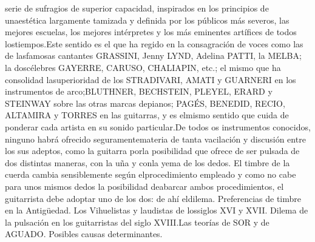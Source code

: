 \documentclass[
10pt, %
a4paper, %
oneside, %
headinclude,footinclude, %
BCOR5mm, %
]{scrartcl}
\begin{document}
{serie de sufragios de superior capacidad, inspirados en los principios de unaestética largamente tamizada y definida por los públicos más severos, las mejores escuelas, los mejores intérpretes y los más eminentes artífices de todos lostiempos.Este sentido es el que ha regido en la consagración de voces como las de lasfamosas cantantes GRASSINI, Jenny LYND, Adelina PATTI, la MELBA; la doscélebres GAYERRE, CARUSO, CHALIAPIN, etc.; el mismo que ha consolidad lasuperioridad de los STRADIVARI, AMATI y GUARNERI en los instrumentos de arco;BLUTHNER, BECHSTEIN, PLEYEL, ERARD y STEINWAY sobre las otras marcas depianos; PAGÉS, BENEDID, RECIO, ALTAMIRA y TORRES en las guitarras, y es elmismo sentido que cuida de ponderar cada artista en su sonido particular.De todos os instrumentos conocidos, ninguno habrá ofrecido seguramentemateria de tanta vacilación y discusión entre los sus adeptos, como la guitarra porla posibilidad que ofrece de ser pulsada de dos distintas maneras, con la uña y conla yema de los dedos. El timbre de la cuerda cambia sensiblemente según elprocedimiento empleado y como no cabe para unos mismos dedos la posibilidad deabarcar ambos procedimientos, el guitarrista debe adoptar uno de los dos: de ahí eldilema. 
Preferencias de timbre en la Antigüedad. Los Vihuelistas y laudistas de lossiglos XVI y XVII. Dilema de la pulsación en los guitarristas del siglo XVIII.Las teorías de SOR y de AGUADO. Posibles causas determinantes.
}
\end{document}
